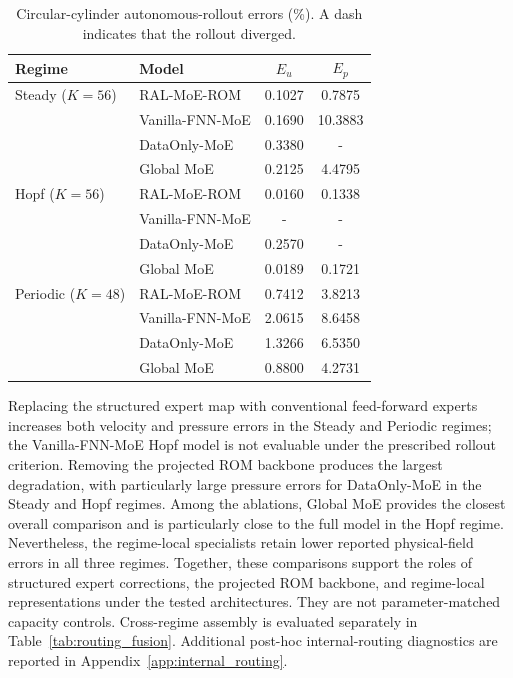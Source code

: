 \documentclass{article}
\begin{document}
\begin{table}[H]
\centering
\caption{Circular-cylinder autonomous-rollout errors (\%). A dash indicates that the rollout diverged.}
\label{tab:circular_full_reorg}
\small
\setlength{\tabcolsep}{4pt}
\begin{tabular}{llcc}
\toprule
Regime & Model & $E_u$ & $E_p$ \\
\midrule
Steady ($K=56$)
& RAL-MoE-ROM & 0.1027 & 0.7875 \\
& Vanilla-FNN-MoE & 0.1690 & 10.3883 \\
& DataOnly-MoE & 0.3380 & - \\
& Global MoE & 0.2125 & 4.4795 \\
\midrule
Hopf ($K=56$)
& RAL-MoE-ROM & 0.0160 & 0.1338 \\
& Vanilla-FNN-MoE & - & - \\
& DataOnly-MoE & 0.2570 & - \\
& Global MoE & 0.0189 & 0.1721 \\
\midrule
Periodic ($K=48$)
& RAL-MoE-ROM & 0.7412 & 3.8213 \\
& Vanilla-FNN-MoE & 2.0615 & 8.6458 \\
& DataOnly-MoE & 1.3266 & 6.5350 \\
& Global MoE & 0.8800 & 4.2731 \\
\bottomrule
\end{tabular}
\end{table}
















Replacing the structured expert map with conventional feed-forward experts increases both velocity and pressure errors in the Steady and Periodic regimes; the Vanilla-FNN-MoE Hopf model is not evaluable under the prescribed rollout criterion. Removing the projected ROM backbone produces the largest degradation, with particularly large pressure errors for DataOnly-MoE in the Steady and Hopf regimes. Among the ablations, Global MoE provides the closest overall comparison and is particularly close to the full model in the Hopf regime. Nevertheless, the regime-local specialists retain lower reported physical-field errors in all three regimes. Together, these comparisons support the roles of structured expert corrections, the projected ROM backbone, and regime-local representations under the tested architectures. They are not parameter-matched capacity controls. Cross-regime assembly is evaluated separately in Table~\ref{tab:routing_fusion}. Additional post-hoc internal-routing diagnostics are reported in
Appendix~\ref{app:internal_routing}.
\end{document}
